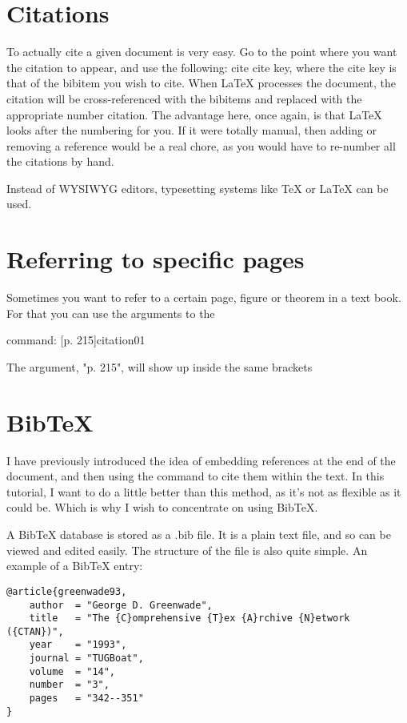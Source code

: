 \section{Citations}

To actually cite a given document is very easy. Go to the point where you want the citation to appear, and use the following: cite cite key, where the cite key is that of the bibitem you wish to cite. When LaTeX processes the document, the citation will be cross-referenced with the bibitems and replaced with the appropriate number citation. The advantage here, once again, is that LaTeX looks after the numbering for you. If it were totally manual, then adding or removing a reference would be a real chore, as you would have to re-number all the citations by hand.

Instead of WYSIWYG editors, typesetting systems like TeX or LaTeX \citep{lamport94} can be used. \cite{Abut1990}

\section{Referring to specific pages}

Sometimes you want to refer to a certain page, figure or theorem in a text book. For that you can use the arguments to the 

 command:
[p. 215]{citation01}

The argument, "p. 215", will show up inside the same brackets

\section{BibTeX}

I have previously introduced the idea of embedding references at the end of the document, and then using the  command to cite them within the text. In this tutorial, I want to do a little better than this method, as it's not as flexible as it could be. Which is why I wish to concentrate on using BibTeX.

A BibTeX database is stored as a .bib file. It is a plain text file, and so can be viewed and edited easily. The structure of the file is also quite simple. An example of a BibTeX entry:

\begin{verbatim}
@article{greenwade93,
    author  = "George D. Greenwade",
    title   = "The {C}omprehensive {T}ex {A}rchive {N}etwork ({CTAN})",
    year    = "1993",
    journal = "TUGBoat",
    volume  = "14",
    number  = "3",
    pages   = "342--351"
}
\end{verbatim}

